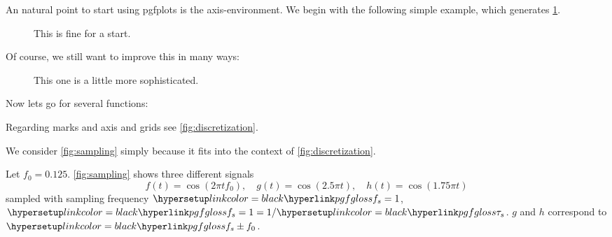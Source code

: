 An natural point to start using pgfplots is the axis-environment. We begin with the following simple example, which generates \cref{fig:simplepgfexample1}.



\begin{figure}[h]
	\centering
	
	\caption{This is fine for a start.}
	\label{fig:simplepgfexample1}
\end{figure}
\clearpage
Of course, we still want to improve this in many ways:

%

\begin{figure}[h]
	\centering
	
	\caption{This one is a little more sophisticated.}
	\label{fig:simplepgfexample2}
\end{figure}

Now lets go for several functions:

%

\begin{figure*}[h]
\centering

\caption{This one is a little more sophisticated.}
\label{fig:simplepgfexample3}
\end{figure*}
\clearpage
Regarding marks and axis and grids see \cref{fig:discretization}.

\begin{figure*}
	\centering
	
	\caption{A visual overview about all pairings of discretization in time (sampling) and value (quantization).}\label{fig:discretization}
\end{figure*}
\clearpage

We consider \cref{fig:sampling} simply because it fits into the context of \cref{fig:discretization}.


\begin{myexample}[Aliasing]\label{exa:sampling}
	Let $f_0 = 0.125$. \cref{fig:sampling} shows three different signals
	\[
	\displaystyle f(t) = \cos(2\pi t f_0),\quad
	g(t) = \cos(2.5\pi t),\quad
	h(t) = \cos(1.75\pi t)
	\]
	 sampled with sampling frequency \(\samplingfreq=1\), \ie \(\samplingfreq = 1 = {1}/\sampletime\). $g$ and $h$ correspond to $\samplingfreq \pm f_0$.
\end{myexample}

\begin{figure*}
	\centering
	
	\caption{\Cf \cref{exa:sampling}.}\label{fig:sampling}
\end{figure*}
